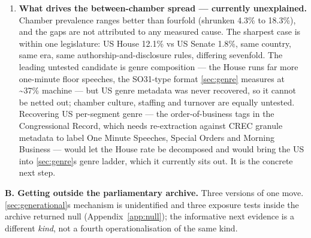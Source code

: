 \begin{enumerate}
\def\labelenumi{\arabic{enumi}.}
\setcounter{enumi}{7}
\tightlist
\item
  \textbf{What drives the between-chamber spread --- currently unexplained.} Chamber
  prevalence ranges better than fourfold (shrunken 4.3\% to 18.3\%), and the gaps are
  not attributed to any measured cause. The sharpest case is within one
  legislature: US House 12.1\% vs US Senate 1.8\%, same country, same era, same
  authorship-and-disclosure rules, differing sevenfold. The leading untested
  candidate is genre composition --- the House runs far more one-minute floor
  speeches, the SO31-type format \cref{sec:genre} measures at \textasciitilde37\% machine --- but US genre
  metadata was never recovered, so it cannot be netted out; chamber culture,
  staffing and turnover are equally untested. Recovering US per-segment genre --- the
  order-of-business tags in the Congressional Record, which needs
  re-extraction against CREC granule metadata to label One Minute Speeches,
  Special Orders and Morning Business --- would let the House rate be
  decomposed and would bring the US into \cref{sec:genre}\textquotesingle s genre ladder, which it
  currently sits out. It is the concrete next step.
\end{enumerate}

\textbf{B. Getting outside the parliamentary archive.} Three versions of one move.
\cref{sec:generational}\textquotesingle s mechanism is unidentified and three exposure tests inside the archive
returned null (Appendix~\ref{app:null}); the informative next evidence is a different \emph{kind},
not a fourth operationalisation of the same kind.


